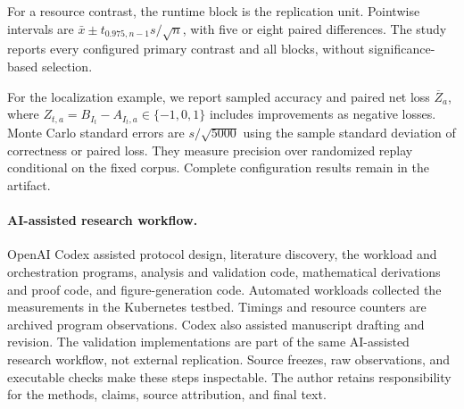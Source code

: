 For a resource contrast, the runtime block is the replication unit. Pointwise intervals are $\bar x\pm t_{0.975,n-1}s/\sqrt n$, with five or eight paired differences. The study reports every configured primary contrast and all blocks, without significance-based selection.

For the localization example, we report sampled accuracy and paired net loss $\overline Z_a$, where $Z_{t,a}=B_{I_t}-A_{I_t,a}\in\{-1,0,1\}$ includes improvements as negative losses. Monte Carlo standard errors are $s/\sqrt{5000}$ using the sample standard deviation of correctness or paired loss. They measure precision over randomized replay conditional on the fixed corpus. Complete configuration results remain in the artifact.

\paragraph{AI-assisted research workflow.}
OpenAI Codex assisted protocol design, literature discovery, the workload and orchestration programs, analysis and validation code, mathematical derivations and proof code, and figure-generation code. Automated workloads collected the measurements in the Kubernetes testbed. Timings and resource counters are archived program observations. Codex also assisted manuscript drafting and revision. The validation implementations are part of the same AI-assisted research workflow, not external replication. Source freezes, raw observations, and executable checks make these steps inspectable. The author retains responsibility for the methods, claims, source attribution, and final text.
